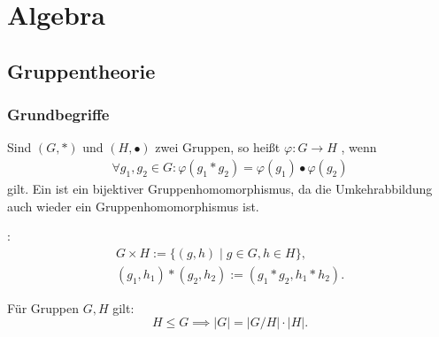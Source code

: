 
\chapter{Algebra}
\section{Gruppentheorie}
\subsection{Grundbegriffe}
\begin{definition}[Gruppenhomomorphismus]
Sind $(G,*)$ und $(H,\bullet)$ zwei Gruppen, so
heißt $\varphi\colon G\to H$ %
, wenn
\begin{gather}
\forall g_1,g_2\in G\colon
  \varphi(g_1*g_2) = \varphi(g_1)\bullet\varphi(g_2)
\end{gather}
gilt. Ein 
ist ein bijektiver Gruppenhomomorphismus, da die Umkehrabbildung
auch wieder ein Gruppenhomomorphismus ist.
\end{definition}
\begin{definition}
:
\begin{gather}
G\times H := \{(g,h)\mid g\in G, h\in H\},\\
(g_1,h_1)*(g_2,h_2) := (g_1*g_2, h_1*h_2).
\end{gather}
\end{definition}
\noindent
{} Für Gruppen $G,H$ gilt:
\begin{equation}
H\le G\implies |G| = |G/H|\cdot |H|.
\end{equation}

